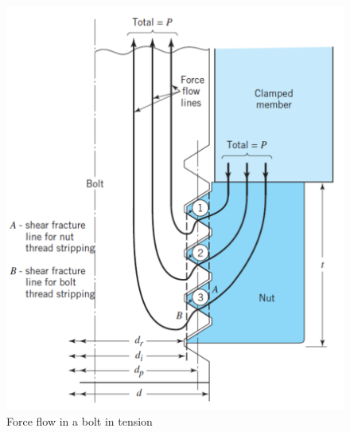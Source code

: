 \documentclass[
10pt,
a4paper,
openany,
svgnames,
]{book}
\begin{document}
\begin{figure}[h]
  \centering
  \includegraphics[scale=0.5]{pictures/Bolt/force-flow-bolt}
  \caption{Force flow in a bolt in tension \cite{juvinall2006fundamentals}}
  \label{fig: force flow in bolt}
\end{figure}
\end{document}
